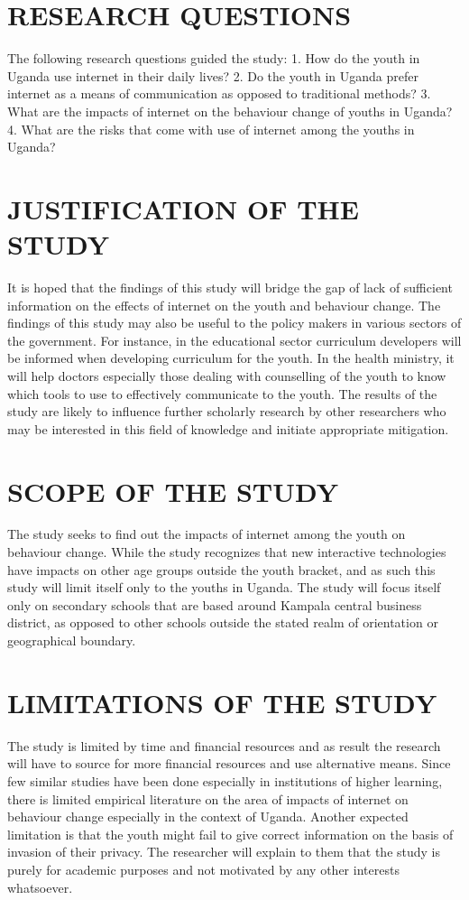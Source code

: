 \documentclass[10pt,letterpaper]{article}
\begin{document}
\section{ RESEARCH QUESTIONS}
The following research questions guided the study: 
1. How do the youth in Uganda use internet in their daily lives? 
2. Do the youth in Uganda prefer internet as a means of communication as opposed to traditional methods? 
3. What are the impacts of internet on the behaviour change of youths in Uganda? 
4. What are the risks that come with use of internet among the youths in Uganda?

\section{JUSTIFICATION OF THE STUDY}
 It is hoped that the findings of this study will bridge the gap of lack of sufficient information on the effects of internet on the youth and behaviour change. The findings of this study may also be useful to the policy makers in various sectors of the government. For instance, in the educational sector curriculum developers will be informed when developing curriculum for the youth. In the health ministry, it will help doctors especially those dealing with counselling of the youth to know which tools to use to effectively communicate to the youth. The results of the study are likely to influence further scholarly research by other researchers who may be interested in this field of knowledge and initiate appropriate mitigation.
\section{SCOPE OF THE STUDY }
The study seeks to find out the impacts of internet among the youth on behaviour change. While the study recognizes that new interactive technologies have impacts on other age groups outside the youth bracket, and as such this study will limit itself only to the youths in Uganda. The study will focus itself only on secondary schools that are based around Kampala central business district, as opposed to other schools outside the stated realm of orientation or geographical boundary. 
\section{LIMITATIONS OF THE STUDY}
The study is limited by time and financial resources and as result the research will have to source for more financial resources and use alternative means. Since few similar studies have been done especially in institutions of higher learning, there is limited empirical literature on the area of impacts of internet on behaviour change especially in the context of Uganda. Another expected limitation is that the youth might fail to give correct information on the basis of invasion of their privacy. The researcher will explain to them that the study is purely for academic purposes and not motivated by any other interests whatsoever. 
\end{document}
